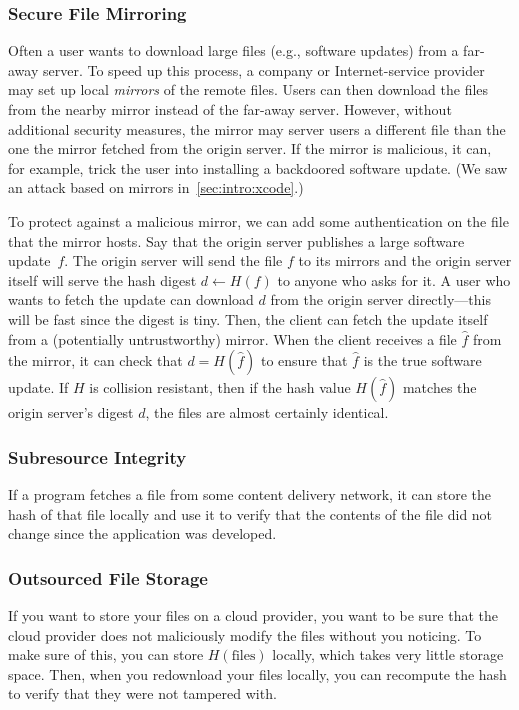 \subsubsection{Secure File Mirroring}
Often a user wants to download large files (e.g., software updates) from a far-away server.
To speed up this process, a company or Internet-service provider may set up local \emph{mirrors}
of the remote files.
Users can then download the files from the nearby mirror instead of the far-away server.
However, without additional security measures, the mirror may 
server users a different file than the one the mirror fetched from the origin server.
If the mirror is malicious, it can, for example, trick the user into installing
a backdoored software update.
(We saw an attack based on mirrors in~\cref{sec:intro:xcode}.)

To protect against a malicious mirror, we can add some authentication on the file that the mirror hosts.
Say that the origin server publishes a large software update~$f$.
The origin server will send the file $f$ to its mirrors and the origin
server itself will serve the hash digest $d\gets H(f)$ to anyone who asks for it.
A user who wants to fetch the update can download $d$ from the origin server directly---this
will be fast since the digest is tiny.
Then, the client can fetch the update itself from a (potentially untrustworthy) mirror.
When the client receives a file $\hat f$ from the mirror, it can check that $d = H(\hat f)$
to ensure that $\hat f$ is the true software update.
If $H$ is collision resistant, then if the hash value $H(\hat f)$ matches the origin server's digest $d$,
the files are almost certainly identical.

\subsubsection{Subresource Integrity}
If a program fetches a file from some content
delivery network, it can store the hash of that
file locally and use it to verify that the
contents of the file did not change since the
application was developed.

\subsubsection{Outsourced File Storage}
If you want to store your files on a cloud
provider, you want to be sure that the cloud
provider does not maliciously modify the files
without you noticing. To make sure of this, you
can store $H(\text{files})$ locally, which takes
very little storage space. Then, when you
redownload your files locally, you can recompute
the hash to verify that they were not tampered
with.

